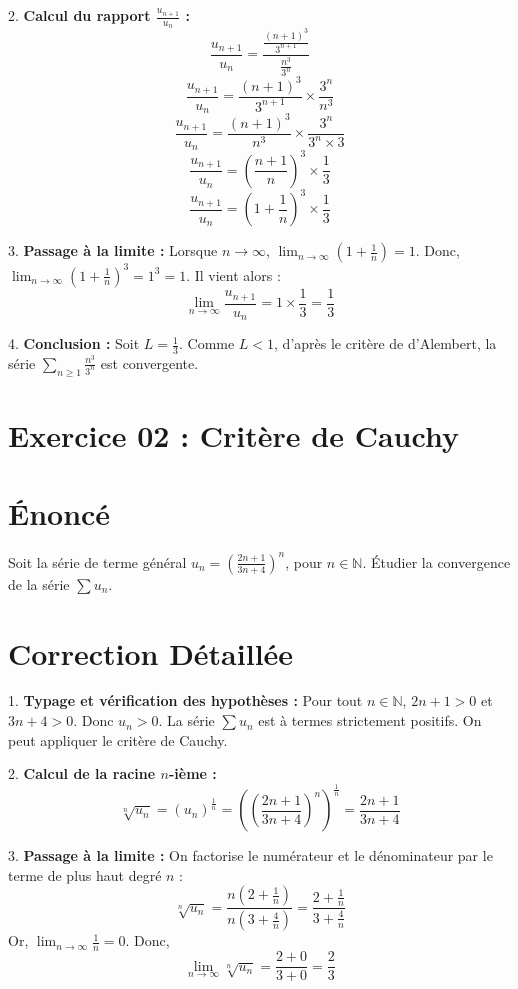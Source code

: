 \documentclass[12pt, a4paper]{article}
\begin{document}
2. \textbf{Calcul du rapport $\frac{u_{n+1}}{u_n}$ :}
   $$\frac{u_{n+1}}{u_n} = \frac{\frac{(n+1)^3}{3^{n+1}}}{\frac{n^3}{3^n}}$$
   $$\frac{u_{n+1}}{u_n} = \frac{(n+1)^3}{3^{n+1}} \times \frac{3^n}{n^3}$$
   $$\frac{u_{n+1}}{u_n} = \frac{(n+1)^3}{n^3} \times \frac{3^n}{3^n \times 3}$$
   $$\frac{u_{n+1}}{u_n} = \left(\frac{n+1}{n}\right)^3 \times \frac{1}{3}$$
   $$\frac{u_{n+1}}{u_n} = \left(1 + \frac{1}{n}\right)^3 \times \frac{1}{3}$$

3. \textbf{Passage à la limite :}
   Lorsque $n \to \infty$, $\lim_{n \to \infty} \left(1 + \frac{1}{n}\right) = 1$.
   Donc, $\lim_{n \to \infty} \left(1 + \frac{1}{n}\right)^3 = 1^3 = 1$.
   Il vient alors :
   $$\lim_{n \to \infty} \frac{u_{n+1}}{u_n} = 1 \times \frac{1}{3} = \frac{1}{3}$$

4. \textbf{Conclusion :}
   Soit $L = \frac{1}{3}$. Comme $L < 1$, d'après le critère de d'Alembert, la série $\sum_{n \ge 1} \frac{n^3}{3^n}$ est convergente.


\section*{Exercice 02 : Critère de Cauchy}

\section{Énoncé}
Soit la série de terme général $u_n = \left(\frac{2n+1}{3n+4}\right)^n$, pour $n \in \mathbb{N}$.
Étudier la convergence de la série $\sum u_n$.

\section{Correction Détaillée}
1. \textbf{Typage et vérification des hypothèses :}
   Pour tout $n \in \mathbb{N}$, $2n+1 > 0$ et $3n+4 > 0$. Donc $u_n > 0$.
   La série $\sum u_n$ est à termes strictement positifs. On peut appliquer le critère de Cauchy.

2. \textbf{Calcul de la racine $n$-ième :}
   $$\sqrt[n]{u_n} = \left(u_n\right)^{\frac{1}{n}} = \left( \left(\frac{2n+1}{3n+4}\right)^n \right)^{\frac{1}{n}} = \frac{2n+1}{3n+4}$$

3. \textbf{Passage à la limite :}
   On factorise le numérateur et le dénominateur par le terme de plus haut degré $n$ :
   $$\sqrt[n]{u_n} = \frac{n(2 + \frac{1}{n})}{n(3 + \frac{4}{n})} = \frac{2 + \frac{1}{n}}{3 + \frac{4}{n}}$$
   Or, $\lim_{n \to \infty} \frac{1}{n} = 0$.
   Donc,
   $$\lim_{n \to \infty} \sqrt[n]{u_n} = \frac{2 + 0}{3 + 0} = \frac{2}{3}$$
\end{document}
